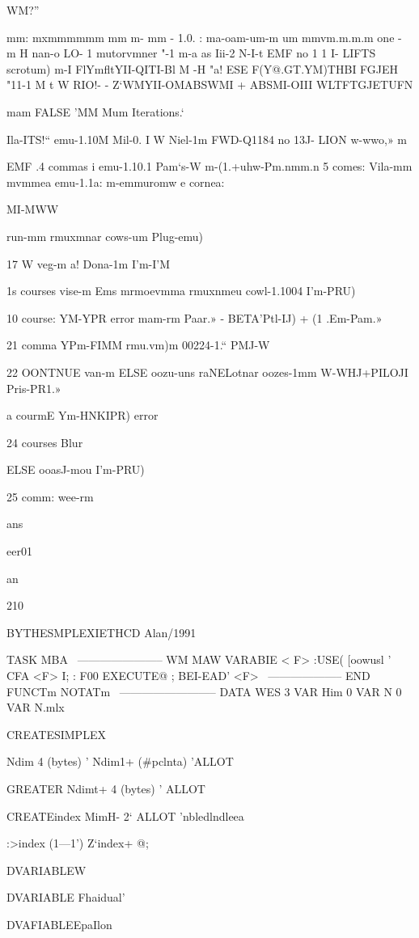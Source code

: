 {{{{{{{{{{WM?”

mm: mxmmmmmm
mm m- mm - 1.0.
: ma-oam-um-m
um mmvm.m.m.m
one - m H
nan-o
LO- 1
mutorvmner
"-1
m-a
as
Iii-2
N-I-t
EMF
no 1 1 I- LIFTS
scrotum) m-I
FlYmﬂtYII-QITI-Bl
M -H
"a!
ESE F(Y@.GT.YM)THBI
FGJEH "11-1
M
t W
RIO!- - Z‘WMYII-OMABSWMI + ABSMI-OIII
WLTFTGJETUFN

mam FALSE 'MM Mum Iterations.‘

Ila-ITS!“
emu-1.10M
Mil-0.
I W
Niel-1m
FWD-Q1184
no 13J- LION
w-wwo,»
m

EMF
.4 commas
i emu-1.10.1
Pam‘s-W
m-(1.+uhw-Pm.nmm.n
5 comes:
Vila-mm
mvmmea
emu-1.1a:
m-emmuromw
e cornea:

MI-MWW

 

run-mm
rmuxmnar
cows-um
Plug-emu)

17 W
veg-m
a!
Dona-1m
I’m-I'M

1s courses
vise-m
Ems
mrmoevmma
rmuxnmeu
cowl-1.1004
I’m-PRU)

10 course:
YM-YPR
error
mam-rm
Paar.» - BETA'Ptl-IJ) + (1 .Em-Pam.»

21 comma
YPm-FIMM
rmu.vm)m
00224-1.“
PMJ-W

22 OONTNUE
van-m
ELSE
oozu-uns
raNELotnar
oozes-1mm
W-WHJ+PILOJI
Pris-PR1.»

a courmE
Ym-HNKIPR)
error

24 courses
Blur

ELSE
ooasJ-mou
I’m-PRU)

25 comm:
wee-rm

ans

eer01

an

210

\WIIZATW BYTHESMPLEXIETHCD
\mmmstw Alan/1991

TASK MBA
\ ----------------------- WM MAW
VARABIE < F>
:USE( [oowusl ' CFA <F> I;
: F00 EXECUTE@ ;
BEI-EAD' <F>
\ -------------------- END FUNCTm NOTATm
\ -------------------------- DATA WES
3 VAR Him
0 VAR N
0 VAR N.mlx

CREATESIMPLEX{{ Ndim 4 (bytes) ' Ndim1+ (#pclnta)
'ALLOT

GREATER Ndimt+ 4 (bytes) ' ALLOT \nelduale

CREATEindex MimH- 2‘ ALLOT \arruyloraem'nbledlndleea

:>index (1—1') Z‘index+ @;

DVARIABLEW

DVARIABLE Fhaidual'

DVAFIABLEEpaIlon

}}}}}}}}}}}}
